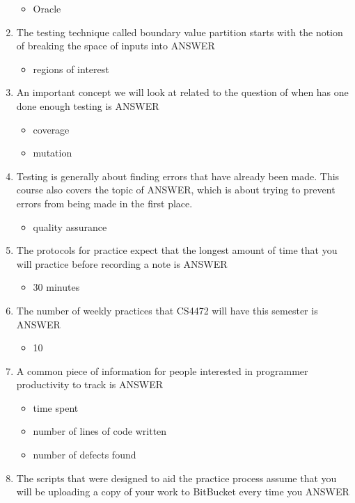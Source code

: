 \documentclass{exam}
\begin{document}
\begin{enumerate}
\begin{itemize}
\item Oracle
\end{itemize}
\item The testing technique called boundary value partition starts with the notion of breaking the space of inputs into ANSWER
\begin{itemize}
\item regions of interest
\end{itemize}
\item An important concept we will look at related to the question of when has one done enough testing is ANSWER
\begin{itemize}
\item coverage
\item mutation
\end{itemize}
\item Testing is generally about finding errors that have already been made.  This course also covers the topic of ANSWER, which is about trying to prevent errors from being made in the first place.
\begin{itemize}
\item quality assurance
\end{itemize}
\item The protocols for practice expect that the longest amount of time that you will practice before recording a note is ANSWER
\begin{itemize}
\item 30 minutes
\end{itemize}
\item The number of weekly practices that CS4472 will have this semester is ANSWER
\begin{itemize}
\item 10
\end{itemize}
\item A common piece of information for people interested in programmer productivity to track is ANSWER
\begin{itemize}
\item time spent
\item number of lines of code written
\item number of defects found
\end{itemize}
\item The scripts that were designed to aid the practice process assume that you will be uploading a copy of your work to BitBucket every time you ANSWER
\begin{itemize}

\end{itemize}
\end{enumerate}
\end{document}
